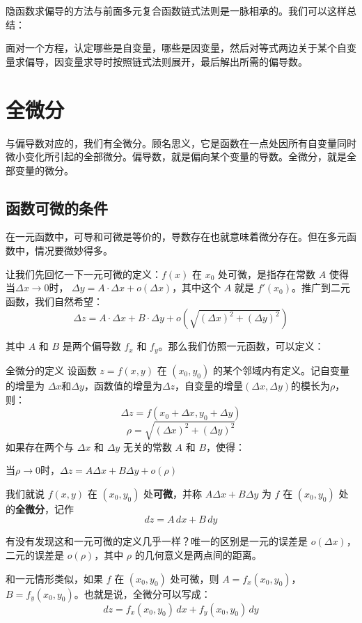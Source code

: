 隐函数求偏导的方法与前面多元复合函数链式法则是一脉相承的。我们可以这样总结：

面对一个方程，认定哪些是自变量，哪些是因变量，然后对等式两边关于某个自变量求偏导，因变量求导时按照链式法则展开，最后解出所需的偏导数。


\section{全微分}
与偏导数对应的，我们有全微分。顾名思义，它是函数在一点处因所有自变量同时微小变化所引起的全部微分。偏导数，就是偏向某个变量的导数。全微分，就是全部变量的微分。

\subsection{函数可微的条件}

在一元函数中，可导和可微是等价的，导数存在也就意味着微分存在。但在多元函数中，情况要微妙得多。

让我们先回忆一下一元可微的定义：$f(x)$ 在 $x_0$ 处可微，是指存在常数 $A$ 使得当$\Delta x \to 0$时，
$\Delta y = A \cdot \Delta x + o(\Delta x)$，其中这个 $A$ 就是 $f'(x_0)$。推广到二元函数，我们自然希望：
\[
\Delta z = A \cdot \Delta x + B \cdot \Delta y + o\!(\sqrt{(\Delta x)^2 + (\Delta y)^2})
\]

其中 $A$ 和 $B$ 是两个偏导数 $f_x$ 和 $f_y$。那么我们仿照一元函数，可以定义：

\begin{definition}{全微分的定义}{}
设函数 $z = f(x, y)$ 在 $(x_0, y_0)$ 的某个邻域内有定义。记自变量的增量为 $\Delta x$和$\Delta y$，函数值的增量为$\Delta z$，自变量的增量$(\Delta x,\Delta y)$的模长为$\rho$，则：
  \[
  \Delta z = f(x_0+\Delta x, y_0+\Delta y)
  \]
  \[
  \rho = \sqrt{(\Delta x)^2 + (\Delta y)^2}
  \]
  如果存在两个与 $\Delta x$ 和 $\Delta y$ 无关的常数 $A$ 和 $B$，使得：
\begin{center}
    当$\rho \to 0$时，$\Delta z = A \Delta x + B \Delta y + o(\rho)$
\end{center}

我们就说 $f(x, y)$ 在 $(x_0, y_0)$ 处\textbf{可微}，并称 $A \Delta x + B \Delta y$ 为 $f$ 在 $(x_0, y_0)$ 处的\textbf{全微分}，记作
\[
dz = A\, dx + B\, dy
\]
\end{definition}

有没有发现这和一元可微的定义几乎一样？唯一的区别是一元的误差是 $o(\Delta x)$，二元的误差是 $o(\rho)$，其中 $\rho$ 的几何意义是两点间的距离。

和一元情形类似，如果 $f$ 在 $(x_0, y_0)$ 处可微，则 $A = f_x(x_0, y_0)$，$B = f_y(x_0, y_0)$。也就是说，全微分可以写成：
\[
dz = f_x(x_0, y_0)\, dx + f_y(x_0, y_0)\, dy
\]

